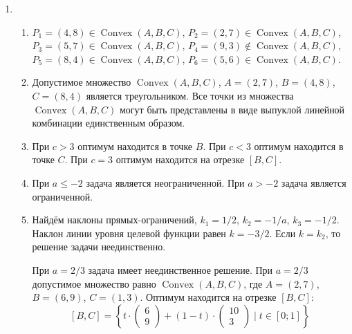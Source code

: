 \documentclass[12pt]{article}
\DeclareMathOperator{\Convex}{Convex}
\DeclareMathOperator{\hull}{\Convex}
\begin{document}
\begin{enumerate}
  \item %
  \begin{enumerate}
    \item $P_1 = (4, 8)  \in \hull(A, B, C)$, $P_2 = (2, 7)  \in \hull(A, B, C)$, 
    $P_3 = (5, 7) \in \hull(A, B, C)$, $P_4 = (9, 3) \notin \hull(A, B, C)$,
    $P_5 = (8, 4) \in \hull(A, B, C)$, $P_6 = (5, 6)  \in \hull(A, B, C)$. 
    \item Допустимое множество $\hull(A, B, C)$, $A = (2, 7)$, $B = (4, 8)$, $C = (8, 4)$  является треугольником. 
    Все точки из множества $\hull(A, B, C)$ могут быть представлены в виде выпуклой линейной комбинации единственным образом. 
    \item При $c > 3$ оптимум находится в точке $B$. 
    При $c < 3$ оптимум находится в точке $C$. 
    При $c = 3$ оптимум находится на отрезке $[B, C]$.
    \item При $a \leq -2$ задача является неограниченной. 
    При $a > -2$ задача является ограниченной. 
    \item Найдём наклоны прямых-ограничений, $k_1 = 1/2$, $k_2 = -1/a$, $k_3 = -1/2$.
    Наклон линии уровня целевой функции равен $k = -3/2$.
    Если $k = k_2$, то решение задачи неединственно.
    
    При $a = 2/3$ задача имеет неединственное решение. 
    При $a = 2/3$ допустимое множество равно $\hull(A, B, C)$, где $A = (2, 7)$, $B = (6, 9)$, $C=(1, 3)$. 
    Оптимум находится на отрезке $[B, C]$:
    \[
    [B, C] =  \left\{  t \cdot \begin{pmatrix}
      6 \\
      9
    \end{pmatrix}  + (1 - t)  \cdot \begin{pmatrix}
      10 \\
      3
    \end{pmatrix}   \mid t \in [0;1] \right\}
    \]


\end{enumerate}
\end{enumerate}
\end{document}
